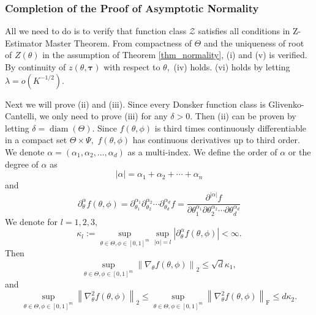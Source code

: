 \documentclass{article}
\numberwithin{equation}{section}
\theoremstyle{plain}
\theoremstyle{definition}
\theoremstyle{remark}
\begin{document}
\subsubsection{Completion of the Proof of Asymptotic Normality}
All we need to do is to verify that function class $\mathcal{Z}$ satisfies all conditions in Z-Estimator Master Theorem. From compactness of $\Theta$ and the uniqueness of root of $Z(\theta)$ in the assumption of Theorem \ref{thm_normality}, (i) and (v) is verified. By continuity of $z(\theta,\boldsymbol{\tau})$ with respect to $\theta,$ (iv) holds. (vi) holds by letting $\lambda = o(K^{-1/2}).$ 

Next we will prove (ii) and (iii). Since every Donsker function class is Glivenko-Cantelli, we only need to prove (iii) for any $\delta > 0.$ Then (ii) can be proven by letting $\delta = \operatorname{diam}(\Theta).$ Since $f(\theta,\phi)$ is third times continuously differentiable in a compact set $\Theta \times \Psi,$ $f(\theta,\phi)$ has continuous derivatives up to third order. 
We denote $\alpha = (\alpha_1,\alpha_2,...,\alpha_d)$ as a multi-index. 
We define the order of $\alpha$ or the degree of $\alpha$ as
\begin{equation*}
    |\alpha|=\alpha_{1}+\alpha_{2}+\cdots+\alpha_{n}
\end{equation*}
and
\begin{equation}\label{notation1}
    \partial^{\alpha}_{\theta} f(\theta,\phi) = \partial_{\theta_1}^{\alpha_{1}} \partial_{\theta_2}^{\alpha_{2}} \cdots \partial_{\theta_d}^{\alpha_{d}} f=\frac{\partial^{|\alpha|} f}{\partial \theta_{1}^{\alpha_{1}} \partial \theta_{2}^{\alpha_{2}} \cdots \partial \theta_{d}^{\alpha_{d}}}
\end{equation}
We denote for $l = 1,2,3,$
\begin{equation}
    \kappa_{l} := \sup_{\theta \in \Theta, \phi \in [0,1]^m} \sup_{\left|\alpha\right| = l} \left| \partial^{\alpha}_{\theta} f(\theta,\phi) \right| < \infty.
\end{equation}
Then
\begin{equation*}
    \sup_{\theta \in \Theta, \phi \in [0,1]^m} \left\|\nabla_{\theta} f(\theta,\phi)\right\|_2 \leq \sqrt{d} \kappa_1,
\end{equation*}
and
\begin{equation*}
    \sup_{\theta \in \Theta, \phi \in [0,1]^m} \left\| \nabla_{\theta}^2 f(\theta,\phi)\right\|_2 \leq \sup_{\theta \in \Theta, \phi \in [0,1]^m} \left\| \nabla_{\theta}^2 f(\theta,\phi)\right\|_{\operatorname{F}} \leq d \kappa_2.
\end{equation*}
\end{document}
